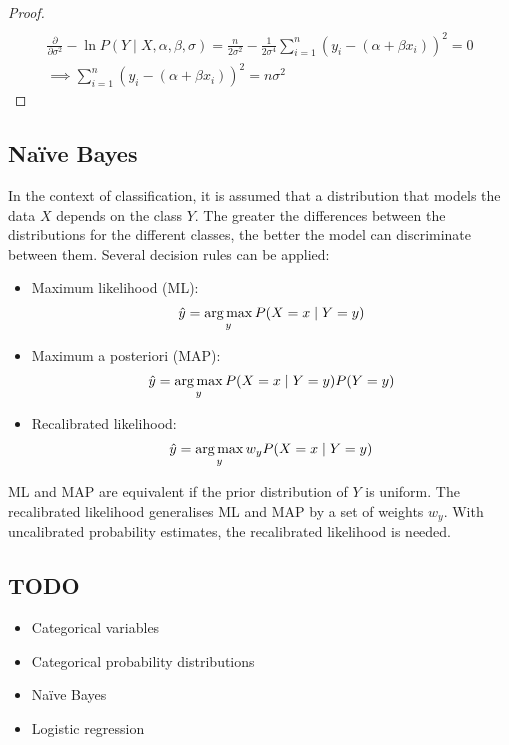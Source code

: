 \begin{thm}
\begin{proof}
\begin{equation}
\begin{split}
      \end{split}
    \end{equation}
    \begin{equation}
      \begin{split}
        \frac{\partial}{\partial \sigma^2} - \ln P(Y \mid X, \alpha, \beta, \sigma)
        = \frac{n}{2\sigma^2} - \frac{1}{2\sigma^4} \sum_{i = 1}^{n} (y_i - (\alpha + \beta x_i))^2 = 0 \\
        \implies \sum_{i = 1}^{n} (y_i - (\alpha + \beta x_i))^2 = n\sigma^2
      \end{split}
    \end{equation}
  \end{proof}
\end{thm}

\subsection{Naïve Bayes}

In the context of classification, it is assumed that a distribution that models
the data $X$ depends on the class $Y$.
The greater the differences between the distributions for the different
classes, the better the model can discriminate between them.
Several decision rules can be applied:
\begin{itemize}
  \item Maximum likelihood (ML):
        \begin{equation}
          \hat{y} = \operatorname*{arg\,max}_y P(X = x \mid Y = y)
        \end{equation}
  \item Maximum a posteriori (MAP):
        \begin{equation}
          \hat{y} = \operatorname*{arg\,max}_y P(X = x \mid Y = y) P(Y = y)
        \end{equation}
  \item Recalibrated likelihood:
        \begin{equation}
          \hat{y} = \operatorname*{arg\,max}_y w_y P(X = x \mid Y = y)
        \end{equation}
\end{itemize}
ML and MAP are equivalent if the prior distribution of $Y$ is uniform.
The recalibrated likelihood generalises ML and MAP by a set of weights $w_y$.
With uncalibrated probability estimates, the recalibrated likelihood is needed.

\subsection{TODO}

\begin{itemize}
  \item Categorical variables
  \item Categorical probability distributions
  \item Naïve Bayes
  \item Logistic regression
\end{itemize}
